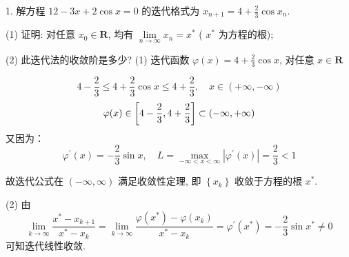 \begin{tcolorbox}[enhanced,colback=green!10!white,colframe=green!50!white,breakable,coltitle=green!25!black,title=2024]
1. 解方程 $ 12-3 x+2 \cos x=0 $ 的迭代格式为 $ x_{n+1}=4+\frac{2}{3} \cos x_{n} $.

(1) 证明: 对任意 $ x_{0} \in \mathbf{R} $, 均有 $ \lim\limits _{n \rightarrow \infty} x_{n}=x^{*} $ ( $ x^{*} $ 为方程的根);

(2) 此迭代法的收敛阶是多少?
 \tcblower
 (1) 迭代函数 $ \varphi(x)=4+\frac{2}{3} \cos x $, 对任意 $ x \in \mathbf{R} $

$$
4-\frac{2}{3} \leqslant 4+\frac{2}{3} \cos x \leqslant 4+\frac{2}{3},\quad x \in(+\infty,-\infty)
$$
$$
\varphi(x) \in\left[4-\frac{2}{3}, 4+\frac{2}{3}\right] \subset(-\infty,+\infty) \\
$$
又因为：
$$
\varphi^{\prime}(x)=-\frac{2}{3} \sin x, \quad L=\max _{-\infty<x<\infty}\left|\varphi^{\prime}(x)\right|=\frac{2}{3}<1
$$

故迭代公式在 $ (-\infty, \infty) $ 满足收敛性定理, 即 $ \left\{x_{k}\right\} $ 收敛于方程的根 $ x^{*} $.

(2) 由
$$
\lim _{k \rightarrow \infty} \frac{x^{*}-x_{k+1}}{x^{*}-x_{k}}=\lim _{k \rightarrow \infty} \frac{\varphi\left(x^{*}\right)-\varphi\left(x_{k}\right)}{x^{*}-x_{k}}=\varphi^{\prime}\left(x^{*}\right)=-\frac{2}{3} \sin x^{*} \neq 0
$$
可知迭代线性收敛.
 \end{tcolorbox}


